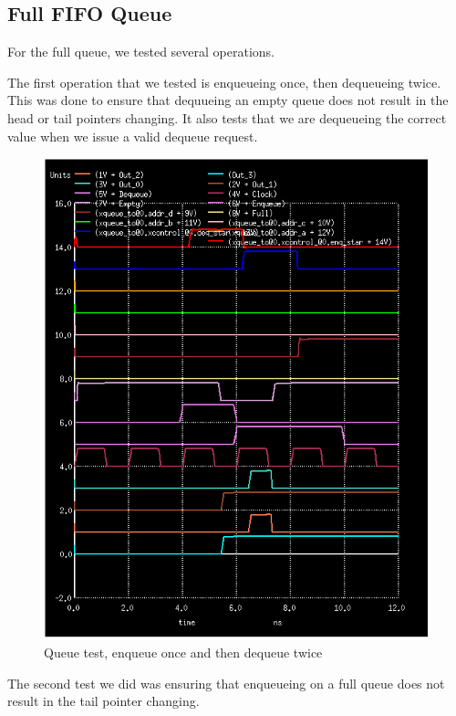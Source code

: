 \documentclass[12pt]{report}
\begin{document}
\subsection*{Full FIFO Queue}
For the full queue, we tested several operations.

The first operation that we tested is enqueueing once, then dequeueing twice. This was done to ensure that dequueing an empty queue does not result in the head or tail pointers changing. It also tests that we are dequeueing the correct value when we issue a valid dequeue request.

\begin{figure}[H]
  \centering
    \includegraphics[width=1.0\textwidth]{queue_toplevel_test_enq_deq_deq.PNG}
  \caption{Queue test, enqueue once and then dequeue twice}
\end{figure}

The second test we did was ensuring that enqueueing on a full queue does not result in the tail pointer changing.
\end{document}
